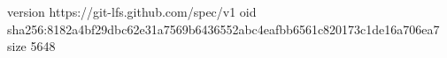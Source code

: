 version https://git-lfs.github.com/spec/v1
oid sha256:8182a4bf29dbc62e31a7569b6436552abc4eafbb6561c820173c1de16a706ea7
size 5648
